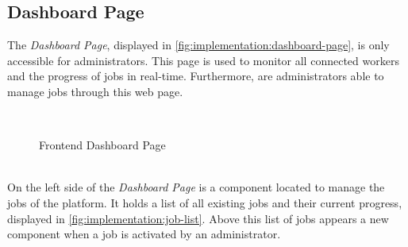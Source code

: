 \subsection{Dashboard Page}
\label{subsec:implementation:dashboard-page}
The \emph{Dashboard Page}, displayed in \autoref{fig:implementation:dashboard-page}, is only accessible for administrators. This page is used to monitor all connected workers and the progress of jobs in real-time. Furthermore, are administrators able to manage jobs through this web page.
\begin{figure}[htbp]
    \myfloatalign
     \\
    \caption{Frontend Dashboard Page}
    \label{fig:implementation:dashboard-page}
\end{figure}
~\\
On the left side of the \emph{Dashboard Page} is a component located to manage the jobs of the platform. It holds a list of all existing jobs and their current progress, displayed in \autoref{fig:implementation:job-list}. Above this list of jobs appears a new component when a job is activated by an administrator.

